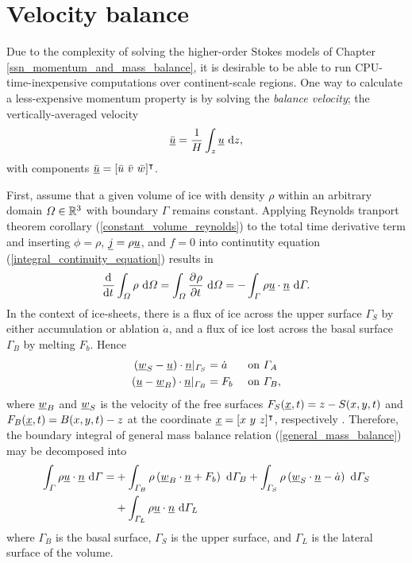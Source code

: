 
\chapter{Velocity balance} \label{ssn_balance_velocity}

Due to the complexity of solving the higher-order Stokes models of Chapter \ref{ssn_momentum_and_mass_balance}, it is desirable to be able to run CPU-time-inexpensive computations over continent-scale regions.  One way to calculate a less-expensive momentum property is by solving the \emph{balance velocity}; the vertically-averaged velocity
\begin{align}
  \label{balance_velocity}
  \bar{\underline{u}} = \frac{1}{H} \int_z \underline{u} \ \mathrm{d}z,
\end{align}
with components $\bar{\rankone{u}} = [\bar{u}\ \bar{v}\ \bar{w}]\T$.  

First, assume that a given volume of ice with density $\rho$ within an arbitrary domain $\varOmega \in \mathbb{R}^3$ with boundary $\Gamma$ remains constant.  Applying Reynolds tranport theorem corollary (\ref{constant_volume_reynolds}) to the total time derivative term and inserting $\phi = \rho$, $\underline{j} = \rho \underline{u}$, and $f=0$ into continutity equation (\ref{integral_continuity_equation}) results in 
\begin{align}
  \label{general_mass_balance}
  \frac{\mathrm{d}^{} }{\mathrm{d} t^{} } \int_{\varOmega} \rho \ \mathrm{d}\varOmega = \int_{\varOmega} \frac{\partial^{} \rho}{\partial t^{} } \ \mathrm{d}\varOmega = - \int_{\varGamma} \rho \underline{u} \cdot \underline{n} \ \mathrm{d}\varGamma.
\end{align}
In the context of ice-sheets, there is a flux of ice across the upper surface $\Gamma_S$ by either accumulation or ablation $\dot{a}$, and a flux of ice lost across the basal surface $\Gamma_B$ by melting $F_b$.  Hence
\begin{align}
  \label{surface_mass_loss}
  \left( \underline{w}_S - \underline{u} \right) \cdot \underline{n} |_{\varGamma_S} &= \dot{a} &&\text{ on } \varGamma_A  \\
  \label{basal_mass_loss}
  \left( \underline{u} - \underline{w}_B \right) \cdot \underline{n} |_{\varGamma_B} &= F_b &&\text{ on } \varGamma_B ,
\end{align}
where $\underline{w}_B$ and $\underline{w}_S$ is the velocity of the free surfaces $F_S(\underline{x},t) = z - S(x,y,t)$ and $F_B(\underline{x},t) = B(x,y,t) - z$ at the coordinate $\underline{x} = [x\ y\ z]^\intercal$, respectively \citep{greve_1997}.  Therefore, the boundary integral of general mass balance relation (\ref{general_mass_balance}) may be decomposed into
\begin{align*}
  \int_{\varGamma} \rho \underline{u} \cdot \underline{n} \ \mathrm{d}\varGamma = &+ \int_{\varGamma_B} \rho \left( \underline{w}_B \cdot \underline{n} + F_b \right) \ \mathrm{d}\varGamma_B + \int_{\varGamma_S} \rho \left( \underline{w}_S \cdot \underline{n} - \dot{a} \right) \ \mathrm{d}\varGamma_S \\
  &+ \int_{\varGamma_L} \rho \underline{u} \cdot \underline{n} \ \mathrm{d}\varGamma_L 
\end{align*}
where $\Gamma_B$ is the basal surface, $\Gamma_S$ is the upper surface, and $\Gamma_L$ is the lateral surface of the volume.

